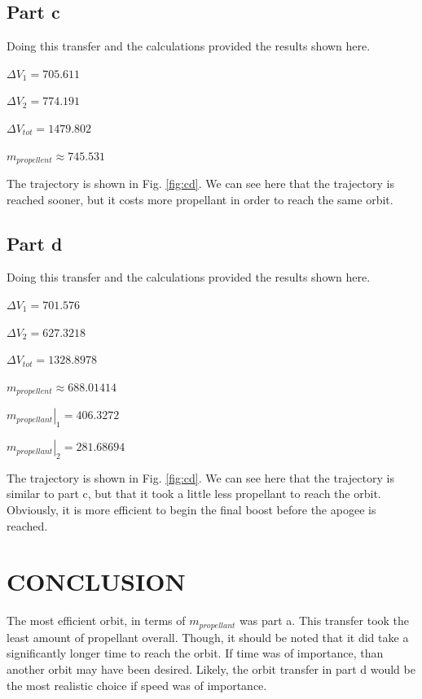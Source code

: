 \documentclass[cleanfoot,cleanhead,onecolumn,10pt,notitlepage]{asme2e}
\begin{document}
\subsection{Part c}

Doing this transfer and the calculations provided the results shown here.

$\Delta V_1 = 705.611$

$\Delta V_2 = 774.191$

$\Delta V_{tot} = 1479.802$

$m_{propellent} \approx 745.531$

The trajectory is shown in Fig. \ref{fig:cd}.  We can see here that the trajectory is reached sooner, but it costs more propellant in order to reach the same orbit.  


\subsection{Part d}

Doing this transfer and the calculations provided the results shown here.

$\Delta V_1 = 701.576$

$\Delta V_2 = 627.3218$

$\Delta V_{tot} = 1328.8978$

$m_{propellent} \approx 688.01414$

$\left.m_{propellant}\right|_1 = 406.3272$

$\left.m_{propellant}\right|_2 = 281.68694$

The trajectory is shown in Fig. \ref{fig:cd}.  We can see here that the trajectory is similar to part c, but that it took a little less propellant to reach the orbit.  Obviously, it is more efficient to begin the final boost before the apogee is reached.



\section{CONCLUSION}

The most efficient orbit, in terms of $m_{propellant}$ was part a.  This transfer took the least amount of propellant overall.  Though, it should be noted that it did take a significantly longer time to reach the orbit.  If time was of importance, than another orbit may have been desired.  Likely, the orbit transfer in part d would be the most realistic choice if speed was of importance. 
\end{document}
